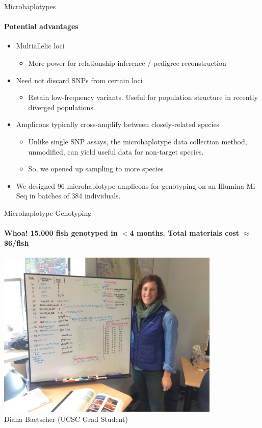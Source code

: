 \documentclass[letter,graphicx]{beamer}
\begin{document}
\begin{frame}{Microhaplotypes}
\framesubtitle{Potential advantages}
\begin{itemize}
\item Multiallelic loci
\begin{itemize}
\item More power for relationship inference / pedigree reconstruction
\end{itemize}
\item Need not discard SNPs from certain loci
\begin{itemize}
\item Retain low-frequency variants.  Useful for population structure in recently diverged populations.
\end{itemize}
\item Amplicons typically cross-amplify between closely-related species
\begin{itemize}
\item Unlike single SNP assays, the microhaplotype data collection method, unmodified,
can yield useful data for non-target species.
\item So, we opened up sampling to more species
\end{itemize}
\item We designed 96 microhaplotype amplicons for genotyping on an Illumina Mi-Seq in batches of 384 individuals.
\end{itemize}
\end{frame}










\begin{frame}{Microhaplotype Genotyping}
\framesubtitle{Whoa!  15,000 fish genotyped in $<$4 months. Total materials cost $\approx$\$6/fish}
\includegraphics[width = 0.8\textwidth]{figs/diana.jpg}\\
{\footnotesize Diana Baetscher (UCSC Grad Student) }
\end{frame}
\end{document}
